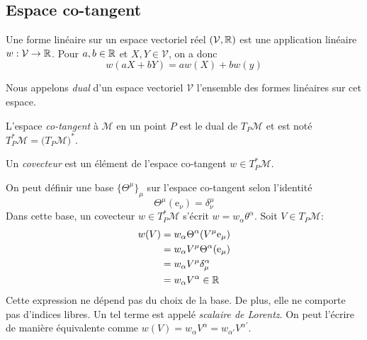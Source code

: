 {\subsection{Espace co-tangent}
\begin{theoremframe}
    \begin{defi}
        Une forme linéaire sur un espace vectoriel réel $(\mathcal{V},\mathbb{R})$ est une application linéaire $w:\mathcal{V} \to \mathbb{R}$. Pour $a,b\in \mathbb{R}$ et $X,Y \in \mathcal{V}$, on a donc
        \begin{equation}
            w(aX+bY) = aw(X)+bw(y)
        \end{equation}
    \end{defi}
\end{theoremframe}
Nous appelons \textit{dual} d'un espace vectoriel $\mathcal{V}$ l'ensemble des formes linéaires sur cet espace.
\begin{theoremframe}
    \begin{defi}
        L'espace \textit{co-tangent} à $\mathcal{M}$ en un point $P$ est le dual de $T_P\mathcal{M}$ et est noté $T_P^*\mathcal{M} = (T_P\mathcal{M)^*}$.
    \end{defi}
\end{theoremframe}
\begin{theoremframe}
    \begin{defi}
        Un \textit{covecteur} est un élément de l'espace co-tangent $w\in T_P^*\mathcal{M}$.
    \end{defi}
\end{theoremframe}
On peut définir une base $\{\Theta^\mu\}_\mu$ sur l'espace co-tangent selon l'identité
\begin{equation}
    \Theta^\mu(\mathrm{e}_\nu)=\delta^\mu_\nu
\end{equation}
Dans cette base, un covecteur $w\in T_P^*\mathcal{M}$ s'écrit $w = w_\alpha \theta^\alpha$. Soit $V \in T_P\mathcal{M}$:
\begin{align*}
    w(V) &= w_{\alpha} \Theta^{\alpha}(V^{\mu} \mathrm{e}_\mu)\\
    &=w_{\alpha} V^{\mu}\Theta^{\alpha} (\mathrm{e}_{\mu})\\
    &= w_{\alpha} V^{\mu}\delta^{\alpha}_{\mu}\\
    &= w_{\alpha} V^{\alpha} \in \mathbb{R}
\end{align*}
Cette expression ne dépend pas du choix de la base. De plus, elle ne comporte pas d'indices libres. Un tel terme est appelé \emph{scalaire de Lorentz}. On peut l'écrire de manière équivalente comme $w(V) = w_{\alpha} V^{\alpha} = w_{\alpha '} V^{\alpha '} $.
}

